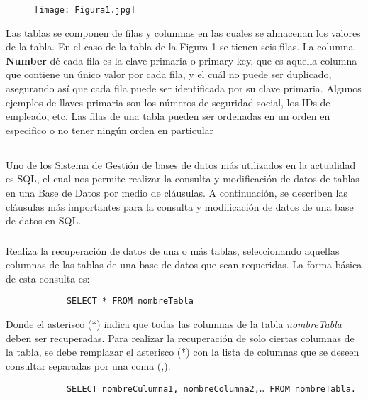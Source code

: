 \documentclass[10pt,a4paper]{article} %
\begin{document}
	\begin{figure}[H]\label{img1}
		\texttt{[image: Figura1.jpg]}
		\centering
		\label{img:Figura1}
	\end{figure}
	
	Las tablas se componen de filas y columnas en las cuales se almacenan los valores de la tabla. En el caso de la tabla de la Figura 1 se tienen seis filas. La columna \textbf{Number} dé cada fila es la clave primaria o primary key, que es aquella columna que contiene un {\' u}nico valor por cada fila, y el cu{\' a}l no puede ser duplicado, asegurando as{\' i} que cada fila puede ser identificada por su clave primaria. Algunos ejemplos de llaves primaria son los n{\' u}meros de seguridad social, los IDs de empleado, etc. Las filas de una tabla pueden ser ordenadas en un orden en especifico o no tener ning{\' u}n orden en particular
	
	
	\subsection{}
	{\large Uno de los Sistema de Gesti{\' o}n de bases de datos m{\' a}s utilizados en la actualidad es SQL, el cual nos permite realizar la consulta y modificaci{\' o}n de datos de tablas en una Base de Datos por medio de cl{\' a}usulas. A continuaci{\' o}n, se describen las cl{\' a}usulas m{\' a}s importantes para la consulta y modificaci{\' o}n de datos de una base de datos en SQL.
	}
	
	\subsubsection{\color{colorESCOM}{Clausula SELECT…FROM}}
	{\large Realiza la recuperaci{\' o}n de datos de una o m{\' a}s tablas, seleccionando aquellas columnas de las tablas de una base de datos que sean requeridas. La forma b{\' a}sica de esta consulta es:
		
		\begin{lstlisting}
			SELECT * FROM nombreTabla
		\end{lstlisting}
		
		Donde el asterisco (*) indica que todas las columnas de la tabla \textit{nombreTabla} deben ser recuperadas. Para realizar la recuperaci{\' o}n de solo ciertas columnas de la tabla, se debe remplazar el asterisco (*) con la lista de columnas que se deseen consultar separadas por una coma (,).
		
		
		\begin{lstlisting}
			SELECT nombreCulumna1, nombreColumna2,… FROM nombreTabla.
		\end{lstlisting}
	}
	
\end{document}
